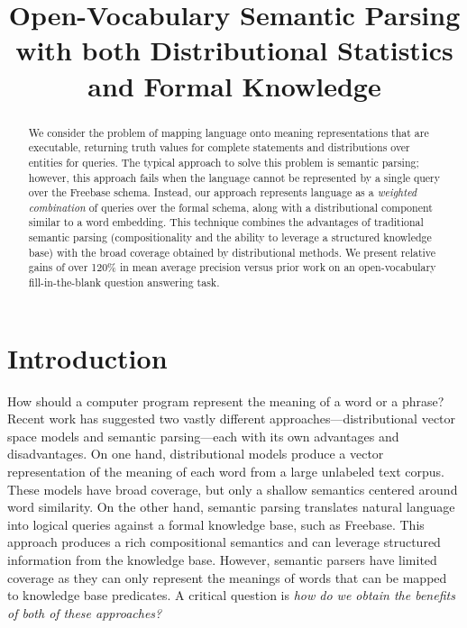 \documentclass[11pt]{article}
\title{Open-Vocabulary Semantic Parsing\\with both Distributional
Statistics and Formal Knowledge}
\author{}%
\date{}
\begin{document}
\maketitle

\begin{abstract}

  We consider the problem of mapping language onto meaning
  representations that are executable, returning truth values for
  complete statements and distributions over entities for queries.
  The typical approach to solve this problem is semantic parsing;
  however, this approach fails when the language cannot be represented
  by a single query over the Freebase schema.  Instead, our approach
  represents language as a \emph{weighted combination} of queries over
  the formal schema, along with a distributional component similar to
  a word embedding.  This technique combines the advantages of
  traditional semantic parsing (compositionality and the ability to
  leverage a structured knowledge base) with the broad coverage
  obtained by distributional methods.  We present relative gains of
  over 120\% in mean average precision versus prior work on an
  open-vocabulary fill-in-the-blank question answering task.

\end{abstract}

\section{Introduction}

How should a computer program represent the meaning of a word or a
phrase? Recent work has suggested two vastly different
approaches---distributional vector space models and semantic
parsing---each with its own advantages and disadvantages. On one hand,
distributional models produce a vector representation of the meaning
of each word from a large unlabeled text corpus. These models have
broad coverage, but only a shallow semantics centered around word
similarity. On the other hand, semantic parsing translates natural
language into logical queries against a formal knowledge base, such as
Freebase. This approach produces a rich compositional semantics and
can leverage structured information from the knowledge base. However,
semantic parsers have limited coverage as they can only represent the
meanings of words that can be mapped to knowledge base predicates. A
critical question is \emph{how do we obtain the benefits of both of
these approaches?}
\end{document}
